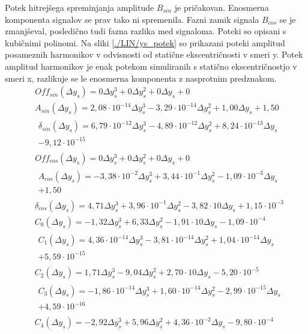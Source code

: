 Potek hitrejšega spreminjanja amplitude $B_{sin}$ je pričakovan. Enosmerna komponenta signalov se prav tako ni spremenila. Fazni zamik signala $B_{cos}$ se je zmanjševal, posledično tudi fazna razlika med signaloma. Poteki so opisani s kubičnimi polinomi. Na sliki \ref{./LIN/ys_potek} so prikazani poteki amplitud posameznih harmonikov v odvisnosti od statične ekscentričnosti v smeri y.  Potek amplitud harmonikov je enak potekom simuliranih s statično ekscentričnostjo v smeri x, razlikuje se le enosmerna komponenta z nasprotnim predznakom.
\begin{eqnarray}
\label{analog_lin_ys}
&Off_{sin}(\Delta y_s) = 0\Delta y_s^{3}+0\Delta y_s^{2}+0\Delta y_s+0 \\
&A_{sin}(\Delta y_s) =2,08\cdot 10^{-14}\Delta y_s^{3}-3,29\cdot 10^{-14}\Delta y_s^{2}+1,00\Delta y_s+1,50 \\                           
& \begin{split}\delta_{sin}(\Delta y_s) =6,79\cdot 10^{-12}\Delta y_s^{3}-4,89\cdot 10^{-12}\Delta y_s^{2}+8,24\cdot 10^{-13}\Delta y_s\\-9,12\cdot 10^{-15}\end{split} \\ 
&Off_{cos}(\Delta y_s) = 0\Delta y_s^{3}+0\Delta y_s^{2}+0\Delta y_s+0 \\
&\begin{split}A_{cos}(\Delta y_s) =-3,38\cdot 10^{-2}\Delta y_s^{3}+3,44\cdot 10^{-1}\Delta y_s^{2}-1,09\cdot 10^{-3}\Delta y_s\\+1,50 \end{split}\\               
&\delta_{cos}(\Delta y_s) =4,71\Delta y_s^{3}+3,96\cdot 10^{-1}\Delta y_s^{2}-3,82\cdot 10\Delta y_s+1,15\cdot 10^{-3}
\end{eqnarray}
\begin{eqnarray}
\label{nap_lin_ys}
&C_0(\Delta y_s) =-1,32\Delta y_s^{3}+6,33\Delta y_s^{2}-1,91\cdot 10\Delta y_s-1,09\cdot 10^{-4} \\                                   
&\begin{split}C_1(\Delta y_s) =4,36\cdot 10^{-14}\Delta y_s^{3}-3,81\cdot 10^{-14}\Delta y_s^{2}+1,04\cdot 10^{-14}\Delta y_s\\+5,59\cdot 10^{-15} \end{split}\\ 
&C_2(\Delta y_s) =1,71\Delta y_s^{3}-9,04\Delta y_s^{2}+2,70\cdot 10\Delta y_s-5,20\cdot 10^{-5} \\                                    
&\begin{split}C_3(\Delta y_s) =-1,86\cdot 10^{-14}\Delta y_s^{3}+1,60\cdot 10^{-14}\Delta y_s^{2}-2,99\cdot 10^{-15}\Delta y_s\\+4,59\cdot 10^{-16}\end{split} \\
&C_4(\Delta y_s) =-2,92\Delta y_s^{3}+5,96\Delta y_s^{2}+4,36\cdot 10^{-2}\Delta y_s-9,80\cdot 10^{-4} 
\end{eqnarray}

